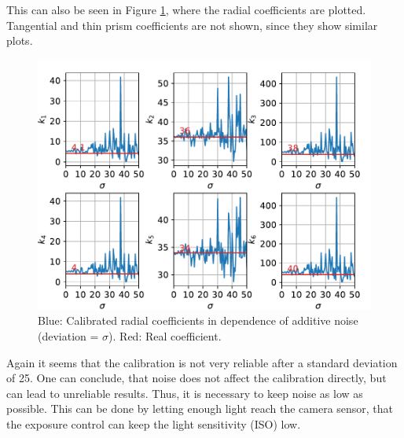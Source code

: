 This can also be seen in Figure \ref{development:noise_k}, where the radial coefficients are plotted.
Tangential and thin prism coefficients are not shown, since they show similar plots.
\begin{figure}
	\centering
	\includegraphics[width=0.9\linewidth]{3-development/calibration/images/noise_k.pdf}
	\caption{Blue: Calibrated radial coefficients in dependence of additive noise (deviation = $\sigma$). Red: Real coefficient.\label{development:noise_k}}
\end{figure}
Again it seems that the calibration is not very reliable after a standard deviation of 25.
One can conclude, that noise does not affect the calibration directly, but can lead to unreliable results.
Thus, it is necessary to keep noise as low as possible.
This can be done by letting enough light reach the camera sensor, that the exposure control can keep the light sensitivity (ISO) low.
\clearpage
